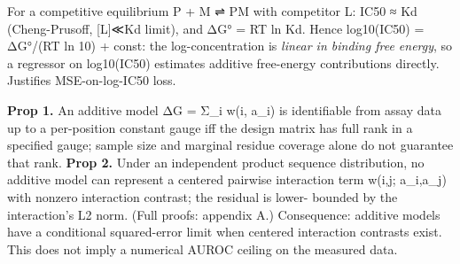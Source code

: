 

For a competitive equilibrium P + M ⇌ PM with competitor L: IC50 ≈ Kd (Cheng-Prusoff, {[}L{]}≪Kd limit), and ΔG° = RT ln Kd. Hence log10(IC50) = ΔG°/(RT ln 10) + const: the log-concentration is \emph{linear in binding free energy}, so a regressor on log10(IC50) estimates additive free-energy contributions directly. Justifies MSE-on-log-IC50 loss.


\textbf{Prop 1.} An additive model ΔG = Σ\_i w(i, a\_i) is identifiable from assay data up to a per-position constant gauge iff the design matrix has full rank in a specified gauge; sample size and marginal residue coverage alone do not guarantee that rank. \textbf{Prop 2.} Under an independent product sequence distribution, no additive model can represent a centered pairwise interaction term w(i,j; a\_i,a\_j) with nonzero interaction contrast; the residual is lower- bounded by the interaction's L2 norm. (Full proofs: appendix A.) Consequence: additive models have a conditional squared-error limit when centered interaction contrasts exist. This does not imply a numerical AUROC ceiling on the measured data.


